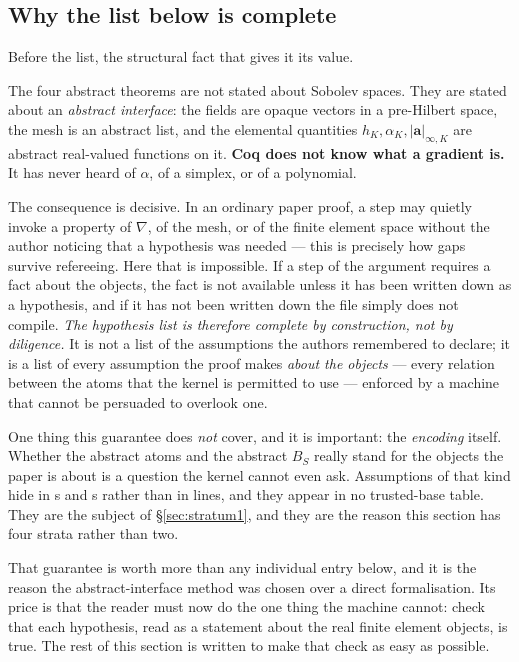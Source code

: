 \documentclass[11pt]{article}
\newcommand{\coq}[1]{\texttt{\detokenize{#1}}}
\newcommand{\aK}{\alpha_K}
\begin{document}
\subsection{Why the list below is complete}\label{sec:complete}

Before the list, the structural fact that gives it its value.

The four abstract theorems are not stated about Sobolev spaces. They are stated
about an \emph{abstract interface}: the fields are opaque vectors in a
pre-Hilbert space, the mesh is an abstract list, and the elemental quantities
$h_K,\aK,|\mathbf a|_{\infty,K}$ are abstract real-valued functions on it.
\textbf{Coq does not know what a gradient is.} It has never heard of
$\alpha$, of a simplex, or of a polynomial.

The consequence is decisive. In an ordinary paper proof, a step may quietly
invoke a property of $\nabla$, of the mesh, or of the finite element space
without the author noticing that a hypothesis was needed --- this is precisely
how gaps survive refereeing. Here that is impossible. If a step of the argument
requires a fact about the objects, the fact is not available unless it has been
written down as a hypothesis, and if it has not been written down the file
simply does not compile. \emph{The hypothesis list is therefore complete by
construction, not by diligence.} It is not a list of the assumptions the authors
remembered to declare; it is a list of every assumption the proof makes
\emph{about the objects} --- every relation between the atoms that the kernel is
permitted to use --- enforced by a machine that cannot be persuaded to overlook
one.

One thing this guarantee does \emph{not} cover, and it is important: the
\emph{encoding} itself. Whether the abstract atoms and the abstract $B_S$ really
stand for the objects the paper is about is a question the kernel cannot even
ask. Assumptions of that kind hide in \coq{Definition}s and \coq{Variable}s
rather than in \coq{Hypothesis} lines, and they appear in no trusted-base table.
They are the subject of \S\ref{sec:stratum1}, and they are the reason this
section has four strata rather than two.

That guarantee is worth more than any individual entry below, and it is the
reason the abstract-interface method was chosen over a direct formalisation.
Its price is that the reader must now do the one thing the machine cannot: check
that each hypothesis, read as a statement about the real finite element objects,
is true. The rest of this section is written to make that check as easy as
possible.
\end{document}
